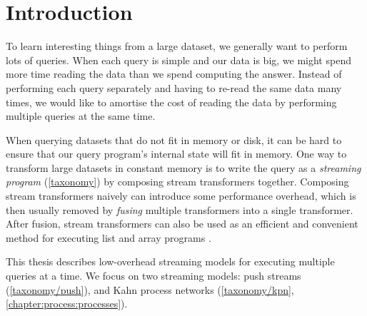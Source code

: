 \chapter{Introduction}
\label{introduction}
To learn interesting things from a large dataset, we generally want to perform lots of queries.
When each query is simple and our data is big, we might spend more time reading the data than we spend computing the answer.
Instead of performing each query separately and having to re-read the same data many times, we would like to amortise the cost of reading the data by performing multiple queries at the same time.

When querying datasets that do not fit in memory or disk, it can be hard to ensure that our query program's internal state will fit in memory.
One way to transform large datasets in constant memory is to write the query as a \emph{streaming program} (\cref{taxonomy}) by composing stream transformers together.
Composing stream transformers naively can introduce some performance overhead, which is then usually removed by \emph{fusing} multiple transformers into a single transformer.
After fusion, stream transformers can also be used as an efficient and convenient method for executing list and array programs \citep{coutts2007stream}.

This thesis describes low-overhead streaming models for executing multiple queries at a time.
We focus on two streaming models: push streams (\cref{taxonomy/push}), and Kahn process networks (\cref{taxonomy/kpn}, \cref{chapter:process:processes}).

